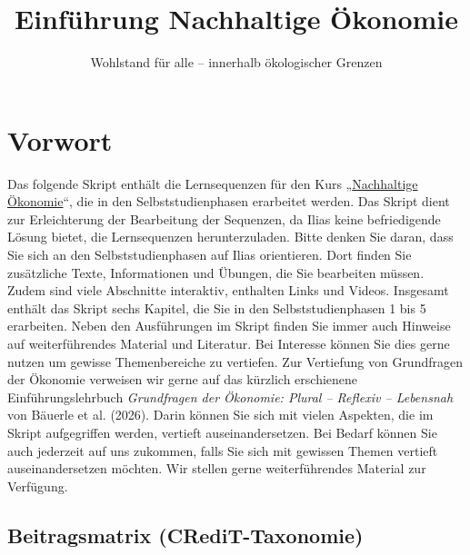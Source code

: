 \documentclass[
  nswissgerman,
  a4paper,
  DIV=11,
  numbers=noendperiod,
  oneside,
  openany]{scrreprt}
\title{Einführung Nachhaltige Ökonomie}
\subtitle{Wohlstand für alle -- innerhalb ökologischer Grenzen}
\author{}
\date{}
\renewcommand*\contentsname{Inhaltsverzeichnis}
\newcommand\contentsname{Inhaltsverzeichnis}
\begin{document}
\maketitle

\renewcommand*\contentsname{Inhaltsverzeichnis}
{
\setcounter{tocdepth}{2}
\tableofcontents
}


\chapter*{Vorwort}\label{vorwort}


Das folgende Skript enthält die Lernsequenzen für den Kurs
„\href{https://ilias.unibe.ch/go/crs/3701540}{Nachhaltige Ökonomie}``,
die in den Selbststudienphasen erarbeitet werden. Das Skript dient zur
Erleichterung der Bearbeitung der Sequenzen, da Ilias keine
befriedigende Lösung bietet, die Lernsequenzen herunterzuladen. Bitte
denken Sie daran, dass Sie sich an den Selbststudienphasen auf Ilias
orientieren. Dort finden Sie zusätzliche Texte, Informationen und
Übungen, die Sie bearbeiten müssen. Zudem sind viele Abschnitte
interaktiv, enthalten Links und Videos. Insgesamt enthält das Skript
sechs Kapitel, die Sie in den Selbststudienphasen 1 bis 5 erarbeiten.
Neben den Ausführungen im Skript finden Sie immer auch Hinweise auf
weiterführendes Material und Literatur. Bei Interesse können Sie dies
gerne nutzen um gewisse Themenbereiche zu vertiefen. Zur Vertiefung von
Grundfragen der Ökonomie verweisen wir gerne auf das kürzlich
erschienene Einführungslehrbuch \emph{Grundfragen der Ökonomie: Plural
-- Reflexiv -- Lebensnah} von Bäuerle et al. (2026). Darin können Sie
sich mit vielen Aspekten, die im Skript aufgegriffen werden, vertieft
auseinandersetzen. Bei Bedarf können Sie auch jederzeit auf uns
zukommen, falls Sie sich mit gewissen Themen vertieft auseinandersetzen
möchten. Wir stellen gerne weiterführendes Material zur Verfügung.

\section*{Beitragsmatrix
(CRediT-Taxonomie)}\label{beitragsmatrix-credit-taxonomie}

\end{document}
